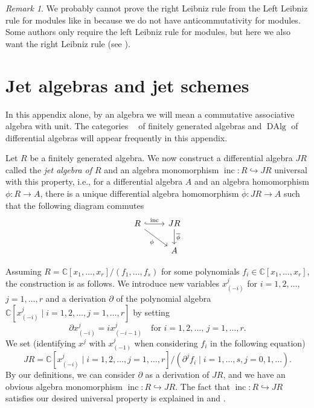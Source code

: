 \documentclass[a4paper, 12pt, reqno]{amsart}
\theoremstyle{remark}
\newtheorem{remark}[theorem]{Remark}
\DeclareMathOperator{\inc}{inc}
\DeclareMathOperator{\Algf}{Alg^f}
\DeclareMathOperator{\DAlg}{DAlg}
\begin{document}
\begin{remark}
  \label{rmk:52}
  We probably cannot prove the right Leibniz rule from the Left Leibniz rule for modules like in  because we do not have anticommutativity for modules.
  Some authors only require the left Leibniz rule for modules, but here we also want the right Leibniz rule (see \cite{caressa_examples_2003}).
\end{remark}

\section{Jet algebras and jet schemes}
\label{sec:jet-algebras-jet}

In this appendix alone, by an algebra we will mean a commutative associative algebra with unit.
The categories $\Algf$ of finitely generated algebras and $\DAlg$ of differential algebras will appear frequently in this appendix.

Let $R$ be a finitely generated algebra.
We now construct a differential algebra $JR$ called the \emph{jet algebra of $R$} and an algebra monomorphism $\inc: R \hookrightarrow JR$ universal with this property, i.e., for a differential algebra $A$ and an algebra homomorphism $\phi: R \to A$, there is a unique differential algebra homomorphism $\overline{\phi}: JR \to A$ such that the following diagram commutes
\begin{equation*}
  \begin{tikzcd}
    R \arrow[r, "\inc", hook] \arrow[rd, "\phi"'] & JR \arrow[d, "\overline{\phi}"] \\
    & A
  \end{tikzcd}
\end{equation*}

Assuming $R = \mathbb{C}[x_1, \dots, x_r]/(f_1, \dots, f_s)$ for some polynomials $f_i \in \mathbb{C}[x_1, \dots, x_r]$, the construction is as follows.
We introduce new variables $x^j_{(-i)}$ for $i = 1, 2, \dots$, $j = 1, \dots, r$ and a derivation $\partial$ of the polynomial algebra $\mathbb{C}[x^j_{(-i)} \mid i = 1, 2, \dots, j = 1, \dots, r]$ by setting
\begin{equation*}
  \partial x^j_{(-i)} = ix^j_{(-i - 1)} \quad \text{for $i = 1, 2, \dots$, $j = 1, \dots, r$}.
\end{equation*}
We set (identifying $x^j$ with $x^j_{(-1)}$ when considering $f_i$ in the following equation)
\begin{equation*}
  JR = \mathbb{C}[x^j_{(-i)} \mid i = 1, 2, \dots, j = 1, \dots, r]/(\partial^jf_i \mid i = 1, \dots, s, j = 0, 1, \dots).
\end{equation*}
By our definitions, we can consider $\partial$ as a derivation of $JR$, and we have an obvious algebra monomorphism $\inc: R \hookrightarrow JR$.
The fact that $\inc: R \hookrightarrow JR$ satisfies our desired universal property is explained in \cite[\S2.3]{arakawa_remark_2012} and \cite{ein_jet_2008}.
\end{document}
